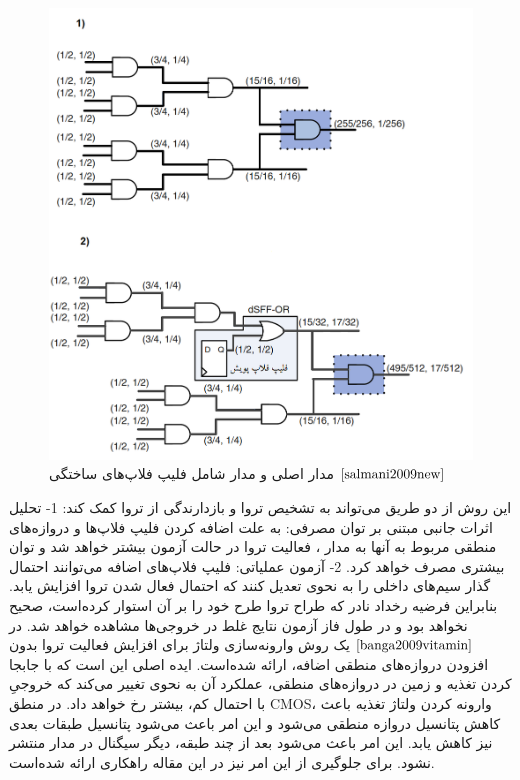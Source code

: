 \begin{figure}
	\begin{center}
		\includegraphics[scale=0.6]{figs/fig5-5.png}
		\caption[مدار اصلی و مدار شامل فلیپ فلاپ‌های ساختگی]{مدار اصلی و مدار شامل فلیپ فلاپ‌های ساختگی
			$\cite{salmani2009new}$}
		\label{fig5-5}
	\end{center}
\end{figure} 
این روش از دو طریق می‌تواند به تشخیص تروا و بازدارندگی از تروا کمک کند:
1- تحلیل اثرات جانبی مبتنی بر توان مصرفی:
به علت اضافه کردن فلیپ فلاپ‌ها و دروازه‌های منطقی مربوط به آنها به مدار ، فعالیت تروا در حالت آزمون بیشتر خواهد شد و توان بیشتری مصرف خواهد کرد. 
2- آزمون عملیاتی:
فلیپ فلاپ‌های اضافه می‌توانند احتمال گذار سیم‌های داخلی را به نحوی تعدیل کنند که احتمال فعال شدن تروا افزایش یابد. بنابراین فرضیه رخداد نادر که طراح تروا طرح خود را بر آن استوار کرده‌است، صحیح نخواهد بود و در طول فاز آزمون نتایج غلط در خروجی‌ها مشاهده خواهد شد.
در $\cite{banga2009vitamin}$ یک روش وارونه‌سازی ولتاژ برای افزایش فعالیت تروا بدون افزودن دروازه‌های منطقی اضافه، ارائه شده‌است. ایده اصلی این است که با جابجا کردن تغذیه و زمین در دروازه‌های منطقی، عملکرد آن به نحوی تغییر می‌کند که خروجیِ با احتمال کم، بیشتر رخ خواهد داد. 
در منطق CMOS، وارونه کردن ولتاژ تغذیه باعث کاهش پتانسیل دروازه منطقی می‌شود و این امر باعث می‌شود پتانسیل طبقات بعدی نیز کاهش یابد. این امر باعث می‌شود بعد از چند طبقه، دیگر سیگنال در مدار منتشر نشود. برای جلوگیری از این امر نیز در این مقاله راهکاری ارائه شده‌است.
